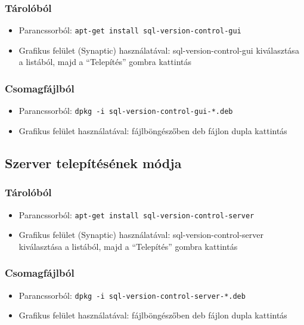 \documentclass[a4paper,12pt]{article}
\begin{document}
\subsubsection{Tárolóból}

\begin{itemize}
\item Parancssorból: \verb|apt-get install sql-version-control-gui|
\item Grafikus felület (Synaptic) használatával: sql-version-control-gui kiválasztása
a listából, majd a ``Telepítés'' gombra kattintás
\end{itemize}

\subsubsection{Csomagfájlból}

\begin{itemize}
\item Parancssorból: \verb|dpkg -i sql-version-control-gui-*.deb|
\item Grafikus felület használatával: fájlböngészőben deb fájlon dupla kattintás
\end{itemize}

\subsection{Szerver telepítésének módja}

\subsubsection{Tárolóból}

\begin{itemize}
\item Parancssorból: \verb|apt-get install sql-version-control-server|
\item Grafikus felület (Synaptic) használatával: sql-version-control-server kiválasztása
a listából, majd a ``Telepítés'' gombra kattintás
\end{itemize}

\subsubsection{Csomagfájlból}

\begin{itemize}
\item Parancssorból: \verb|dpkg -i sql-version-control-server-*.deb|
\item Grafikus felület használatával: fájlböngészőben deb fájlon dupla kattintás
\end{itemize}
\end{document}
